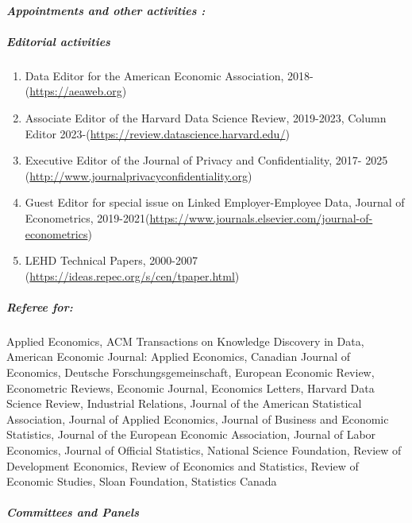 \documentclass[10pt,letterpaper]{report}
\begin{document}
\paragraph{\it \bf Appointments and other activities :}%
\subparagraph{Editorial activities}
\begin{enumerate}
	\item Data Editor for the American Economic Association, 2018- \newline (\url{https://aeaweb.org})
	\item Associate Editor of the Harvard Data Science Review, 2019-2023, Column Editor 2023-\newline (\url{https://review.datascience.harvard.edu/})
	\item Executive Editor of the Journal of Privacy and Confidentiality, 2017- 2025 \newline (\url{http://www.journalprivacyconfidentiality.org})
	\item Guest Editor for special issue on Linked Employer-Employee Data, Journal of Econometrics, 2019-2021\newline (\url{https://www.journals.elsevier.com/journal-of-econometrics})
	\item LEHD Technical Papers, 2000-2007 \newline (\url{https://ideas.repec.org/s/cen/tpaper.html})
\end{enumerate}
\subparagraph{ Referee for:}
  Applied Economics,
  ACM   Transactions on Knowledge Discovery in Data, 
  American Economic Journal: Applied Economics,
  Canadian Journal of Economics, 
  Deutsche Forschungsgemeinschaft,
  European Economic Review,  
  Econometric Reviews, 
  Economic Journal,  
  Economics Letters,
  Harvard Data Science Review,
  Industrial Relations, 
  Journal of the American Statistical Association,
  Journal of Applied Economics, 
  Journal of Business and Economic Statistics,  
  Journal of the European Economic Association,
  Journal of Labor   Economics, 
  Journal of Official Statistics,
  National Science Foundation,
  Review of Development Economics, 
  Review of Economics and Statistics,
  Review of Economic Studies,
  Sloan Foundation,
  Statistics Canada
\subparagraph{Committees and Panels} 
\end{document}
